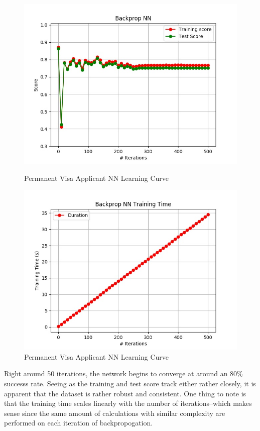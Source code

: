 \documentclass[h]{article}
\begin{document}
 \begin{figure}[H]
      \includegraphics[width=1\textwidth,keepaspectratio]{backprop_nn.jpg} 
      \caption*{Permanent Visa Applicant NN Learning Curve} 
   \endminipage\hfill
      \includegraphics[width=1\textwidth,keepaspectratio]{backprop_nn_time.jpg} 
      \caption*{Permanent Visa Applicant NN Learning Curve} 
   \endminipage\hfill
\end{figure}

Right around 50 iterations, the network begins to converge at around an 80\% 
successs rate.  Seeing as the training and test score track either rather 
closely, it is apparent that the dataset is rather robust and consistent.  One 
thing to note is that the training time scales linearly with the number of 
iterations--which makes sense since the same amount of calculations with similar 
complexity are performed on each iteration of backpropogation.  
\end{document}
